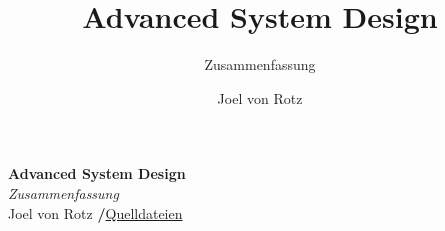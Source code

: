 \documentclass[
  10pt,
  a4paper,
  twocolumn]{article}
\title{Advanced System Design}
\subtitle{Zusammenfassung}
\author{Joel von Rotz}
\date{}
\begin{document}
\makeatletter
\begin{center}
  \vspace*{0.5cm}
  \textbf{\textsf{\Huge Advanced System Design}}\\
  \vspace{0.1cm}
  \textsf{\textit{\large Zusammenfassung}}\\
  \vspace{0.5cm}
  \textsf{\large Joel von
Rotz \hspace{0.3cm}\textbf{/}\hspace{0.3cm}\mbox{\large \faGithub\space \href{https://github.com/joelvonrotz/BSc-electrical-engineering/tree/main/semester\%206/advanced\%20system\%20design}{Quelldateien}}}
\end{center}
\makeatother
\normalfont





\ifdefined\Shaded
  \renewenvironment{Shaded}
    {\begin{tcolorbox}[
      rounded corners,
      colback={codebgcolor},
      colframe={codebgcolor},
      enhanced,
      boxrule=0mm,
      borderline={1pt}{0pt}{gray,dotted},
      left=0mm,
      breakable,
      overlay first={%
          \draw[thick,gray,line width=0.5pt,decoration={zigzag,segment length=4mm, amplitude=2mm/(2*sqrt(2))},decorate]
            (frame.south west) -- (frame.south east);
      },
      overlay middle={%
          \draw[thick,gray,line width=0.5pt,decoration={zigzag,segment length=4mm, amplitude=2mm/(2*sqrt(2))},decorate]
            (frame.south west) -- (frame.south east);
          \draw[thick,gray,line width=0.5pt,decoration={zigzag,segment length=4mm, amplitude=2mm/(2*sqrt(2))},decorate]
            (frame.north west) -- (frame.north east);
      },
      overlay last={%
          \draw[thick,gray,line width=0.5pt,decoration={zigzag,segment length=4mm, amplitude=2mm/(2*sqrt(2))},decorate]
            (frame.north west) -- (frame.north east);
      }
      ]}
    {\end{tcolorbox}}
\fi
\end{document}
